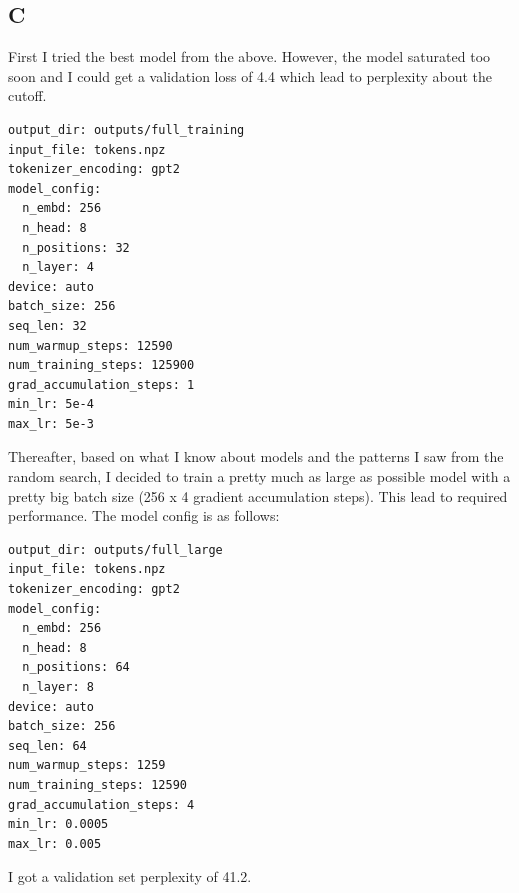 \documentclass{article}
\begin{document}
\subsection*{C}
First I tried the best model from the above. However, the model saturated too soon and I could get a validation loss of 4.4 which lead to perplexity about the cutoff.
\begin{verbatim}
output_dir: outputs/full_training 
input_file: tokens.npz
tokenizer_encoding: gpt2         
model_config:
  n_embd: 256                   
  n_head: 8                    
  n_positions: 32             
  n_layer: 4                      
device: auto                 
batch_size: 256             
seq_len: 32                
num_warmup_steps: 12590   
num_training_steps: 125900
grad_accumulation_steps: 1
min_lr: 5e-4             
max_lr: 5e-3            
\end{verbatim}
Thereafter, based on what I know about models and the patterns I saw from the random search, I decided to train a pretty much as large as possible model with a pretty big batch size (256 x 4 gradient accumulation steps). This lead to required performance. The model config is as follows:
\begin{verbatim}
output_dir: outputs/full_large
input_file: tokens.npz
tokenizer_encoding: gpt2
model_config:
  n_embd: 256
  n_head: 8
  n_positions: 64
  n_layer: 8
device: auto
batch_size: 256
seq_len: 64
num_warmup_steps: 1259
num_training_steps: 12590
grad_accumulation_steps: 4
min_lr: 0.0005
max_lr: 0.005
\end{verbatim}
I got a validation set perplexity of 41.2.
\end{document}
